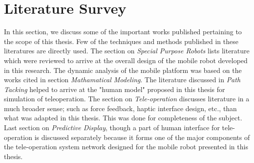 \section{Literature Survey}
\label{sec_LitRev}
In this section, we  discuss some of the important works published pertaining to the scope of this thesis. Few of the techniques and methods published in these literatures are directly used. The section on \textit{Special Purpose Robots} lists literature which were reviewed to arrive at the overall design of the mobile robot developed in this research.
The dynamic analysis of the mobile platform was based on the works cited in section\textit{ Mathamatical Modeling}. 
The literature discussed in \textit{Path Tacking } helped to arrive at the "human model" proposed in this thesis for simulation of teleoperation. 
The section on \textit{Tele-operation} discusses literature in a much broader sense; such as force feedback, haptic interface  design, etc., than what was adapted in this thesis. 
This was done for completeness of the subject. 
Last section on \textit{Predictive Display}, though a part of human interface for tele-operation is discussed separately because it forms one of the major components of the tele-operation system network designed  for the mobile robot  presented in this thesis.   
